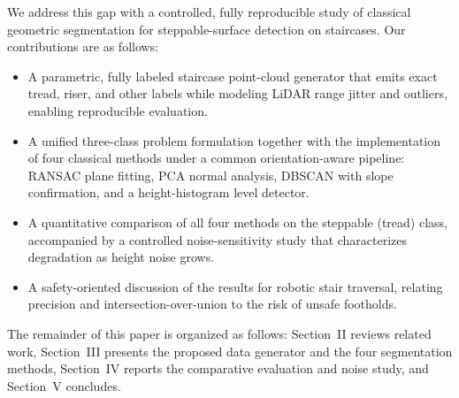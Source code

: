 We address this gap with a controlled, fully reproducible study of
classical geometric segmentation for steppable-surface detection on
staircases. Our contributions are as follows:
\begin{itemize}
  \item A parametric, fully labeled staircase point-cloud generator that
        emits exact tread, riser, and other labels while modeling LiDAR
        range jitter and outliers, enabling reproducible evaluation.
  \item A unified three-class problem formulation together with the
        implementation of four classical methods under a common
        orientation-aware pipeline: RANSAC plane fitting, PCA normal
        analysis, DBSCAN with slope confirmation, and a height-histogram
        level detector.
  \item A quantitative comparison of all four methods on the steppable
        (tread) class, accompanied by a controlled noise-sensitivity
        study that characterizes degradation as height noise grows.
  \item A safety-oriented discussion of the results for robotic stair
        traversal, relating precision and intersection-over-union to the
        risk of unsafe footholds.
\end{itemize}

The remainder of this paper is organized as follows: Section~II reviews
related work, Section~III presents the proposed data generator and the
four segmentation methods, Section~IV reports the comparative evaluation
and noise study, and Section~V concludes.
